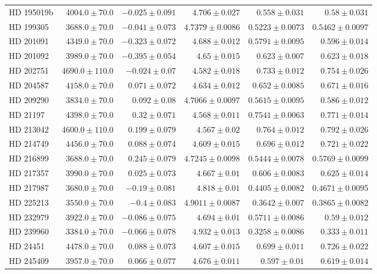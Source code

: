 \begin{longtable*}{lrrrrr}
HD 195019b & $4004.0\pm 70.0$ & $-0.025\pm 0.091$ & $4.706\pm 0.027$ & $0.558\pm 0.031$ & $0.58\pm 0.031$ \\ 
HD 199305 & $3688.0\pm 70.0$ & $-0.041\pm 0.073$ & $4.7379\pm 0.0086$ & $0.5223\pm 0.0073$ & $0.5462\pm 0.0097$ \\ 
HD 201091 & $4349.0\pm 70.0$ & $-0.323\pm 0.072$ & $4.688\pm 0.012$ & $0.5791\pm 0.0095$ & $0.596\pm 0.014$ \\ 
HD 201092 & $3989.0\pm 70.0$ & $-0.395\pm 0.054$ & $4.65\pm 0.015$ & $0.623\pm 0.007$ & $0.623\pm 0.018$ \\ 
HD 202751 & $4690.0\pm 110.0$ & $-0.024\pm 0.07$ & $4.582\pm 0.018$ & $0.733\pm 0.012$ & $0.754\pm 0.026$ \\ 
HD 204587 & $4158.0\pm 70.0$ & $0.071\pm 0.072$ & $4.634\pm 0.012$ & $0.652\pm 0.0085$ & $0.671\pm 0.016$ \\ 
HD 209290 & $3834.0\pm 70.0$ & $0.092\pm 0.08$ & $4.7066\pm 0.0097$ & $0.5615\pm 0.0095$ & $0.586\pm 0.012$ \\ 
HD 21197 & $4398.0\pm 70.0$ & $0.32\pm 0.071$ & $4.568\pm 0.011$ & $0.7541\pm 0.0063$ & $0.771\pm 0.014$ \\ 
HD 213042 & $4600.0\pm 110.0$ & $0.199\pm 0.079$ & $4.567\pm 0.02$ & $0.764\pm 0.012$ & $0.792\pm 0.026$ \\ 
HD 214749 & $4456.0\pm 70.0$ & $0.088\pm 0.074$ & $4.609\pm 0.015$ & $0.696\pm 0.012$ & $0.721\pm 0.022$ \\ 
HD 216899 & $3688.0\pm 70.0$ & $0.245\pm 0.079$ & $4.7245\pm 0.0098$ & $0.5444\pm 0.0078$ & $0.5769\pm 0.0099$ \\ 
HD 217357 & $3990.0\pm 70.0$ & $0.025\pm 0.073$ & $4.667\pm 0.01$ & $0.606\pm 0.0083$ & $0.625\pm 0.014$ \\ 
HD 217987 & $3680.0\pm 70.0$ & $-0.19\pm 0.081$ & $4.818\pm 0.01$ & $0.4405\pm 0.0082$ & $0.4671\pm 0.0095$ \\ 
HD 225213 & $3550.0\pm 70.0$ & $-0.4\pm 0.083$ & $4.9011\pm 0.0087$ & $0.3642\pm 0.007$ & $0.3865\pm 0.0082$ \\ 
HD 232979 & $3922.0\pm 70.0$ & $-0.086\pm 0.075$ & $4.694\pm 0.01$ & $0.5711\pm 0.0086$ & $0.59\pm 0.012$ \\ 
HD 239960 & $3384.0\pm 70.0$ & $-0.066\pm 0.078$ & $4.932\pm 0.013$ & $0.3258\pm 0.0086$ & $0.333\pm 0.011$ \\ 
HD 24451 & $4478.0\pm 70.0$ & $0.088\pm 0.073$ & $4.607\pm 0.015$ & $0.699\pm 0.011$ & $0.726\pm 0.022$ \\ 
HD 245409 & $3957.0\pm 70.0$ & $0.066\pm 0.077$ & $4.676\pm 0.011$ & $0.597\pm 0.01$ & $0.619\pm 0.014$ \\ 

\end{longtable*}
